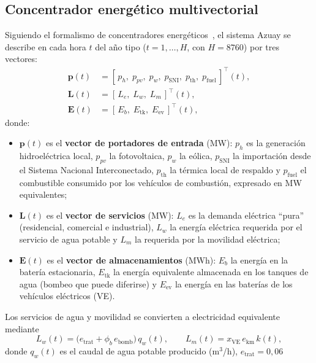 \documentclass[11pt,a4paper]{article}
\newcommand{\vect}[1]{\bm{#1}}
\begin{document}
\subsection{Concentrador energ\'etico multivectorial}
Siguiendo el formalismo de concentradores energ\'eticos~\cite{geidl2007hub,geidl2007opf},
el sistema Azuay se describe en cada hora $t$ del a\~no tipo ($t=1,\dots,H$, con $H=8760$)
por tres vectores:
\begin{align}
\vect{p}(t) &= [\,p_{h},\; p_{pv},\; p_{w},\; p_{\mathrm{SNI}},\; p_{\mathrm{th}},\; p_{\mathrm{fuel}}\,]^{\top}(t),
\label{eq:p}\\
\vect{L}(t) &= [\,L_{e},\; L_{w},\; L_{m}\,]^{\top}(t),
\label{eq:L}\\
\vect{E}(t) &= [\,E_{b},\; E_{\mathrm{tk}},\; E_{\mathrm{ev}}\,]^{\top}(t),
\label{eq:E}
\end{align}
donde:
\begin{itemize}[leftmargin=1.4em,itemsep=1pt]
  \item $\vect{p}(t)$ es el \textbf{vector de portadores de entrada} (MW): $p_h$ es la
  generaci\'on hidroel\'ectrica local, $p_{pv}$ la fotovoltaica, $p_w$ la e\'olica,
  $p_{\mathrm{SNI}}$ la importaci\'on desde el Sistema Nacional Interconectado,
  $p_{\mathrm{th}}$ la t\'ermica local de respaldo y $p_{\mathrm{fuel}}$ el combustible
  consumido por los veh\'iculos de combusti\'on, expresado en MW equivalentes;
  \item $\vect{L}(t)$ es el \textbf{vector de servicios} (MW): $L_e$ es la demanda
  el\'ectrica ``pura'' (residencial, comercial e industrial), $L_w$ la energ\'ia
  el\'ectrica requerida por el servicio de agua potable y $L_m$ la requerida por la
  movilidad el\'ectrica;
  \item $\vect{E}(t)$ es el \textbf{vector de almacenamientos} (MWh): $E_b$ la energ\'ia
  en la bater\'ia estacionaria, $E_{\mathrm{tk}}$ la energ\'ia equivalente almacenada en
  los tanques de agua (bombeo que puede diferirse) y $E_{\mathrm{ev}}$ la energ\'ia en
  las bater\'ias de los veh\'iculos el\'ectricos (VE).
\end{itemize}
Los servicios de agua y movilidad se convierten a electricidad equivalente mediante
\begin{equation}
L_w(t) = \big(e_{\mathrm{trat}} + \phi_{b}\,e_{\mathrm{bomb}}\big)\,q_w(t), \qquad
L_m(t) = x_{\mathrm{VE}}\,e_{\mathrm{km}}\,k(t),
\label{eq:conv}
\end{equation}
donde $q_w(t)$ es el caudal de agua potable producido (m$^3$/h), $e_{\mathrm{trat}}=0{,}06$
\end{document}
